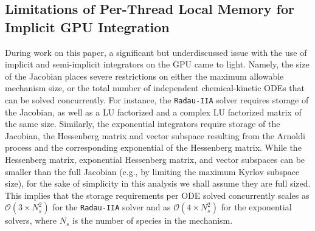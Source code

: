 \documentclass[preprint]{elsarticle}
\begin{document}
\subsection{Limitations of Per-Thread Local Memory for Implicit GPU Integration}
During work on this paper, a significant but underdiscussed issue with the use of implicit and semi-implicit integrators on the GPU came to light.
Namely, the size of the Jacobian places severe restrictions on either the maximum allowable mechanism size, or the total number of independent chemical-kinetic ODEs that can be solved concurrently.
For instance, the \texttt{Radau-IIA} solver requires storage of the Jacobian, as well as a LU factorized and a complex LU factorized matrix of the same size.
Similarly, the exponential integrators require storage of the Jacobian, the Hessenberg matrix and vector subspace resulting from the Arnoldi process and the corresponding exponential of the Hessenberg matrix.
While the Hessenberg matrix, exponential Hessenberg matrix, and vector subspaces can be smaller than the full Jacobian (e.g., by limiting the maximum Kyrlov subspace size), for the sake of simplicity in this analysis we shall assume they are full sized.
This implies that the storage requirements per ODE solved concurrently scales as $\mathcal{O}\left(3 \times N_s^2\right)$ for the \texttt{Radau-IIA} solver and as $\mathcal{O}\left(4 \times N_s^2\right)$ for the exponential solvers, where $N_s$ is the number of species in the mechanism.
\end{document}
